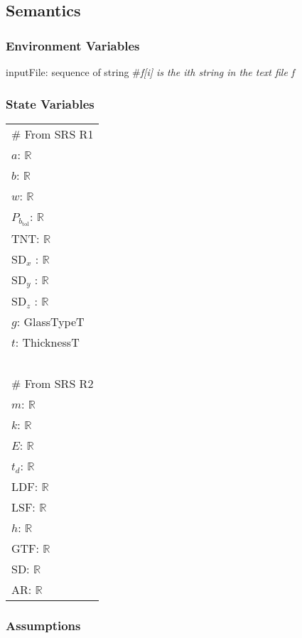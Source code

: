 \documentclass[12pt, titlepage]{article}
\begin{document}
\subsection{Semantics}

\subsubsection{Environment Variables}

inputFile: sequence of string \#\textit{f[i] is the ith string in the text file f}

\subsubsection{State Variables}

\renewcommand{\arraystretch}{1.2}
\begin{longtable*}[l]{l} 
\# From SRS R1\\
$a$: $\mathbb{R}$ \\
$b$: $\mathbb{R}$ \\
$w$: $\mathbb{R}$ \\
$P_{b_\text{tol}}$: $\mathbb{R}$ \\
TNT: $\mathbb{R}$ \\
$\text{SD}_x$ : $\mathbb{R}$ \\
$\text{SD}_y$ : $\mathbb{R}$ \\
$\text{SD}_z$ : $\mathbb{R}$ \\
$g$: GlassTypeT \\
$t$: ThicknessT \\
~\\
\# From SRS R2\\
$m$: $\mathbb{R}$ \\
$k$: $\mathbb{R}$ \\
$E$: $\mathbb{R}$ \\
$t_d$: $\mathbb{R}$ \\
LDF: $\mathbb{R}$ \\
LSF: $\mathbb{R}$ \\
$h$: $\mathbb{R}$ \\
GTF: $\mathbb{R}$\\
SD: $\mathbb{R}$\\
AR: $\mathbb{R}$\\
\end{longtable*}

\subsubsection{Assumptions}
\end{document}
